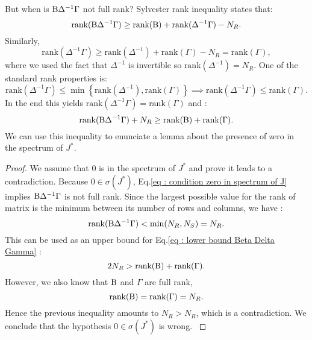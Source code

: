 \documentclass[12pt]{report}
\begin{document}
But when is $\text{B} \Delta^{-1}\Gamma$ not full rank? Sylvester rank inequality \cite{thome_inequalities_2016} states that:
\begin{equation}
\text{rank}(\text{B}\Delta^{-1}\Gamma) \geq \text{rank}(\text{B})+\text{rank}(\Delta^{-1}\Gamma)
-N_R.
\end{equation}
Similarly,
\begin{equation}
\text{rank}(\Delta^{-1}\Gamma) \geq \text{rank}(\Delta^{-1})+\text{rank}(\Gamma)-N_R=\text{rank}(\Gamma),
\end{equation}
where we used the fact that $\Delta^{-1}$ is invertible so $\text{rank}(\Delta^{-1})=N_R$.
One of the standard rank properties is:
\begin{equation}
\text{rank}(\Delta^{-1}\Gamma) \leq \min\left\{\text{rank}(\Delta^{-1}), \text{rank}(\Gamma)\right\} \implies \text{rank}(\Delta^{-1}\Gamma) \leq \text{rank}(\Gamma).
\end{equation}
In the end this yields $\text{rank}(\Delta^{-1}\Gamma)=\text{rank}(\Gamma)$ and :
\begin{equation}
\text{rank}(\text{B}\Delta^{-1}\Gamma) +N_R \geq \text{rank}(\text{B})+\text{rank}(\Gamma). \label{eq : lower bound Beta Delta Gamma}
\end{equation}
We can use this inequality to enunciate a lemma about the presence of zero in the spectrum of $J^*$.
\begin{proof}
{We assume that $0$ is in the spectrum of $J^*$ and prove it leads to a contradiction. Because $0 \in \sigma(J^*)$, Eq.\eqref{eq : condition zero in spectrum of J} implies $\text{B}\Delta^{-1}\Gamma$ is not full rank. Since the largest possible value for the rank of matrix is the minimum between its number of rows and columns, we have :
\begin{equation}
\text{rank}(\text{B}\Delta^{-1}\Gamma)< \min(N_R, N_S) = N_R.
\end{equation}
This can be used as an upper bound for Eq.\eqref{eq : lower bound Beta Delta Gamma} :
\begin{equation}
2 N_R > \text{rank}(\text{B})+\text{rank}(\Gamma).
\end{equation}
However, we also know that $\text{B}$ and $\Gamma$ are full rank, \ie
\begin{equation}
\text{rank}(\text{B})=\text{rank}(\Gamma)=N_R.
\end{equation}
Hence the previous inequality amounts to $N_R > N_R$, which is a contradiction. We conclude that the hypothesis $0 \in \sigma(J^*)$ is wrong.
}
\end{proof}
\end{document}
